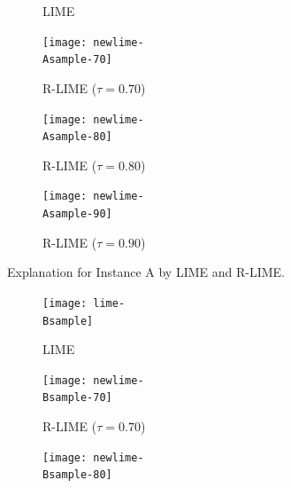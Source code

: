 \documentclass[runningheads]{llncs}
\begin{document}
{{\begin{figure}[p]
\begin{subfigure}[t]{\imgwidth}
          \caption{LIME}\label{fig:A-lime}
        \end{subfigure}
        \begin{subfigure}[t]{\imgwidth}
          \hspace{0.5em}
          \texttt{[image: newlime-\\Asample-70]}
          \caption{R-LIME ($\tau=0.70$)}\label{fig:A-rlime-70}
        \end{subfigure}
        \begin{subfigure}[t]{\imgwidth}
          \texttt{[image: newlime-\\Asample-80]}
          \caption{R-LIME ($\tau=0.80$)}
        \end{subfigure}
        \begin{subfigure}[t]{\imgwidth}
          \hspace{-0.5em}
          \texttt{[image: newlime-\\Asample-90]}
          \caption{R-LIME ($\tau=0.90$)}
        \end{subfigure}
        \caption[Explanation for Instance A by LIME and R-LIME]{%
          Explanation for Instance A by LIME and R-LIME\@.
        }\label{fig:A}
      \end{figure}
      \begin{figure}[p]
        \centering
        \begin{subfigure}[t]{\imgwidth}
          \hspace{-0.7em}
          \texttt{[image: lime-\\Bsample]}
          \caption{LIME}\label{fig:B-lime}
        \end{subfigure}
        \begin{subfigure}[t]{\imgwidth}
          \hspace{0.5em}
          \texttt{[image: newlime-\\Bsample-70]}
          \caption{R-LIME ($\tau=0.70$)}
        \end{subfigure}
        \begin{subfigure}[t]{\imgwidth}
          \hspace{-0.8em}
          \texttt{[image: newlime-\\Bsample-80]}

\end{subfigure}
\end{figure}}}
\end{document}
